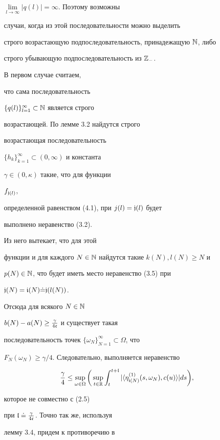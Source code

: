 $\lim\limits_{l\to\infty}|q(l)|=\infty$. Поэтому возможны


случаи, когда из этой последовательности можно выделить


строго возрастающую подпоследовательность, принадежащую $\Bbb N$, либо


строго убывающую подпоследовательность из $\Bbb Z_-$.


В первом случае считаем,


что сама последовательность


$\{q(l)\}_{l=1}^{\infty}\subset\Bbb N$ является строго


возрастающей. По лемме 3.2 найдутся строго


возрастающая последовательность


$\{h_k\}_{k=1}^{\infty}\subset(0,\infty)$ и константа


$\gamma\in (0,\kappa)$ такие, что для функции


$f_{{\frak j}(l)}$,


определенной равенством (4.1), при $j(l)=\frak j(l)$ будет


выполнено неравенство (3.2).


Из него вытекает, что для этой


функции и для каждого $N\in\Bbb N$ найдутся такие $k(N),l(N)\ge N$ и


$p(N)\in\Bbb N$, что будет иметь место неравенство (3.5) при


${\frak j}(N)={\frak i}(N)\dot={\frak j}(l(N))$.


Отсюда для всякого $N\in\Bbb N$\;


$b(N)-a(N)\ge\frac{\gamma}{4\frak c}$ и существует такая


последовательность точек $\{\omega_N\}_{N=1}^{\infty}\subset\Omega$, что


$F_{N}(\omega_N)\ge \gamma/4$. Следовательно, выполняется неравенство


$$


\frac{\gamma}{4}\le\sup\limits_{\mm}\bigg(\sup\limits_{t\in\Bbb R}


\int_{t}^{t+\frak l}


|\la\eta_{{\frak i}(N)}^{(1)}(s,\omega_N),c(u)\ra| ds\bigg),


$$


которое не совместно с (2.5)


при $\frak l\doteq\frac{\gamma}{4\frak c}$. Точно так же, используя


лемму 3.4, придем к противоречию в


